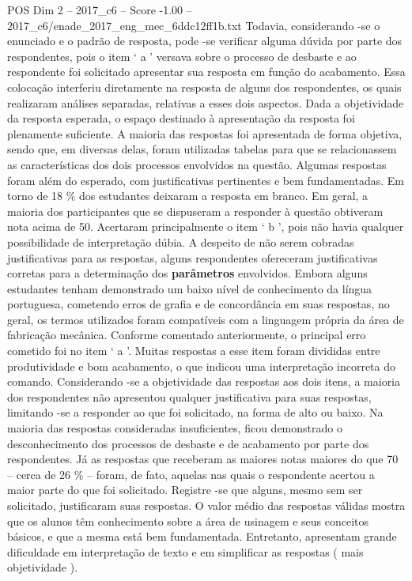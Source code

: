 \begin{textsample}{POS Dim 2 – 2017\_c6 – Score -1.00 – 2017\_c6/enade\_2017\_eng\_mec\_6ddc12ff1b.txt}
Todavia, considerando -se o enunciado e o padrão de resposta, pode -se verificar alguma dúvida por parte dos respondentes, pois o item ‘ a ’ versava sobre o processo de desbaste e ao respondente foi solicitado apresentar sua resposta em função do acabamento.
Essa colocação interferiu diretamente na resposta de alguns dos respondentes, os quais realizaram análises separadas, relativas a esses dois aspectos.
Dada a objetividade da resposta esperada, o espaço destinado à apresentação da resposta foi plenamente suficiente.
A maioria das respostas foi apresentada de forma objetiva, sendo que, em diversas delas, foram utilizadas tabelas para que se relacionassem as características dos dois processos envolvidos na questão.
Algumas respostas foram além do esperado, com justificativas pertinentes e bem fundamentadas.
Em torno de 18 \% dos estudantes deixaram a resposta em branco.
Em geral, a maioria dos participantes que se dispuseram a responder à questão obtiveram nota acima de 50.
Acertaram principalmente o item ‘ b ’, pois não havia qualquer possibilidade de interpretação dúbia.
A despeito de não serem cobradas justificativas para as respostas, alguns respondentes ofereceram justificativas corretas para a determinação dos \textbf{parâmetros} envolvidos.
Embora alguns estudantes tenham demonstrado um baixo nível de conhecimento da língua portuguesa, cometendo erros de grafia e de concordância em suas respostas, no geral, os termos utilizados foram compatíveis com a linguagem própria da área de fabricação mecânica.
Conforme comentado anteriormente, o principal erro cometido foi no item ‘ a ’.
Muitas respostas a esse item foram divididas entre produtividade e bom acabamento, o que indicou uma interpretação incorreta do comando.
Considerando -se a objetividade das respostas aos dois itens, a maioria dos respondentes não apresentou qualquer justificativa para suas respostas, limitando -se a responder ao que foi solicitado, na forma de alto ou baixo.
Na maioria das respostas consideradas insuficientes, ficou demonstrado o desconhecimento dos processos de desbaste e de acabamento por parte dos respondentes.
Já as respostas que receberam as maiores notas maiores do que 70 – cerca de 26 \% – foram, de fato, aquelas nas quais o respondente acertou a maior parte do que foi solicitado.
Registre -se que alguns, mesmo sem ser solicitado, justificaram suas respostas.
O valor médio das respostas válidas mostra que os alunos têm conhecimento sobre a área de usinagem e seus conceitos básicos, e que a mesma está bem fundamentada.
Entretanto, apresentam grande dificuldade em interpretação de texto e em simplificar as respostas ( mais objetividade ).

\end{textsample}
